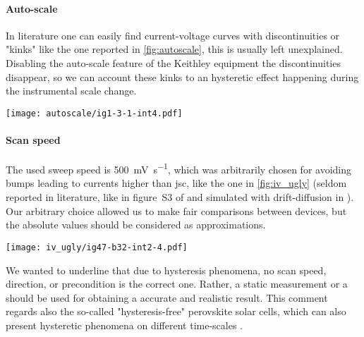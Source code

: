 	\paragraph{Auto-scale}\label{autoscale}
	In literature one can easily find current-voltage curves with discontinuities or "kinks" \cite{Li2016,Snaith2014,Zhang2015} like the one reported in \cref{fig:autoscale}, this is usually left unexplained.
	Disabling the auto-scale feature of the Keithley equipment the discontinuities disappear, so we can account these kinks to an hysteretic effect happening during the instrumental scale change.

	\begin{SCfigure}%
		\centering
		\texttt{[image: autoscale/ig1-3-1-int4.pdf]}
		\label{fig:autoscale}
	\end{SCfigure}

	\paragraph{Scan speed}
	The used sweep speed is \SI{500}{\mV\per\s}, which was arbitrarily chosen for avoiding bumps leading to currents higher than \gls{jsc}, like the one in \cref{fig:iv_ugly} (seldom reported in literature, like in figure~S3 of \cite{Du2018} and simulated with drift-diffusion in \cite{Walter2018}).
	Our arbitrary choice allowed us to make fair comparisons between devices, but the absolute values should be considered as approximations.
	\begin{SCfigure}%
		\centering
		\texttt{[image: iv\_ugly/ig47-b32-int2-4.pdf]}
		\label{fig:iv_ugly}
	\end{SCfigure}
	We wanted to underline that due to hysteresis phenomena, no scan speed, direction, or precondition is the correct one.
	Rather, a static measurement or a  should be used for obtaining a accurate and realistic result.
	This comment regards also the so-called "hysteresis-free" perovskite solar cells, which can also present hysteretic phenomena on different time\hyp{}scales \cite{Bryant2015,Jacobs2018,Du2018}.


